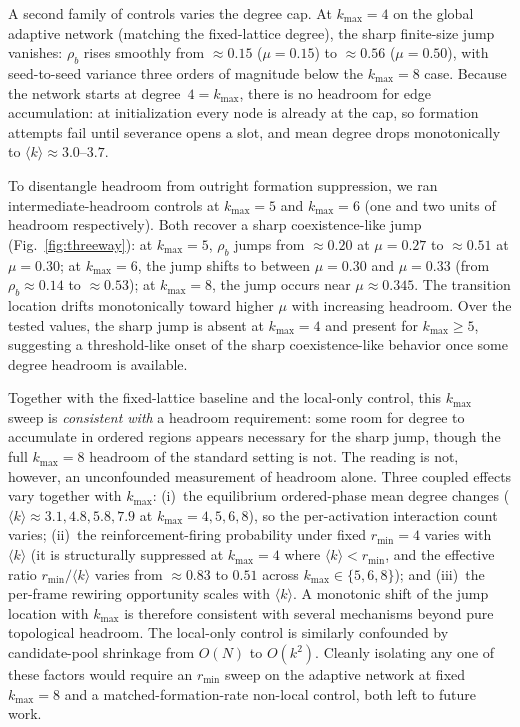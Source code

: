 \documentclass[preprint,12pt]{elsarticle}
\newcommand{\rb}{\rho_b}              %
\newcommand{\kavg}{\langle k \rangle} %
\newcommand{\rmin}{r_{\min}}           %
\newcommand{\kmax}{k_{\max}}           %
\begin{document}
A second family of controls varies the degree cap.
At $\kmax = 4$ on the global adaptive network (matching the
fixed-lattice degree), the sharp finite-size jump vanishes: $\rb$
rises smoothly from $\approx 0.15$ ($\mu = 0.15$) to
$\approx 0.56$ ($\mu = 0.50$), with seed-to-seed variance
three orders of magnitude below the $\kmax = 8$ case.
Because the network starts at degree~$4 = \kmax$, there is
no headroom for edge accumulation: at initialization every
node is already at the cap, so formation attempts fail until
severance opens a slot, and mean degree drops monotonically
to $\kavg \approx 3.0$--$3.7$.

To disentangle headroom from outright formation suppression,
we ran intermediate-headroom controls at $\kmax = 5$ and
$\kmax = 6$ (one and two units of headroom respectively).
Both recover a sharp coexistence-like jump
(Fig.~\ref{fig:threeway}):
at $\kmax = 5$, $\rb$ jumps from $\approx 0.20$ at
$\mu = 0.27$ to $\approx 0.51$ at $\mu = 0.30$;
at $\kmax = 6$, the jump shifts to between
$\mu = 0.30$ and $\mu = 0.33$
(from $\rb \approx 0.14$ to $\approx 0.53$);
at $\kmax = 8$, the jump occurs near $\mu \approx 0.345$.
The transition location drifts monotonically toward higher
$\mu$ with increasing headroom.
Over the tested values, the sharp jump is absent at
$\kmax = 4$ and present for $\kmax \geq 5$, suggesting a
threshold-like onset of the sharp coexistence-like
behavior once some degree headroom is available.

Together with the fixed-lattice baseline and the local-only
control, this $\kmax$ sweep is \emph{consistent with} a
headroom requirement: some room for degree to accumulate in
ordered regions appears necessary for the sharp jump, though
the
full $\kmax = 8$ headroom of the standard setting is not.
The reading is not, however, an unconfounded measurement of
headroom alone.
Three coupled effects vary together with $\kmax$:
(i)~the equilibrium ordered-phase mean degree changes
($\kavg \approx 3.1, 4.8, 5.8, 7.9$ at
$\kmax = 4, 5, 6, 8$), so the per-activation interaction
count varies;
(ii)~the reinforcement-firing probability under fixed
$\rmin = 4$ varies with $\kavg$ (it is structurally suppressed
at $\kmax = 4$ where $\kavg < \rmin$, and the effective ratio
$\rmin/\kavg$ varies from ${\approx}0.83$ to $0.51$ across
$\kmax \in \{5, 6, 8\}$); and
(iii)~the per-frame rewiring opportunity scales with $\kavg$.
A monotonic shift of the jump location with $\kmax$ is
therefore consistent with several mechanisms beyond pure
topological headroom.
The local-only control is similarly confounded by
candidate-pool shrinkage from $O(N)$ to $O(k^2)$.
Cleanly isolating any one of these factors would require an
$\rmin$ sweep on the adaptive network at fixed $\kmax = 8$
and a matched-formation-rate non-local control, both left to
future work.
\end{document}
